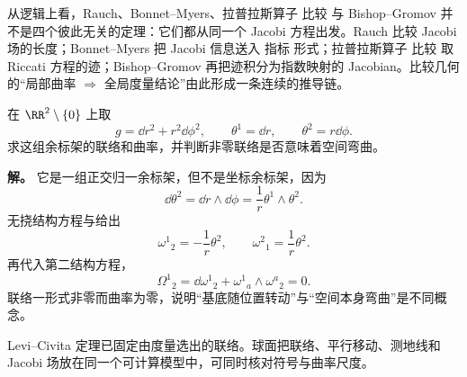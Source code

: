 从逻辑上看，Rauch、Bonnet--Myers、拉普拉斯算子 比较 与 Bishop--Gromov 并不是四个彼此无关的定理：它们都从同一个 Jacobi 方程出发。Rauch 比较 Jacobi 场的长度；Bonnet--Myers 把 Jacobi 信息送入 指标 形式；拉普拉斯算子 比较 取 Riccati 方程的迹；Bishop--Gromov 再把迹积分为指数映射的 Jacobian。比较几何的“局部曲率 $\Rightarrow$ 全局度量结论”由此形成一条连续的推导链。

\begin{exbox}[极坐标中的平坦欧氏平面]
在 $\RR^2\setminus\{0\}$ 上取
\[
g=\dd r^2+r^2\dd\phi^2,
\qquad
\theta^1=\dd r,
\qquad
\theta^2=r\dd\phi.
\]
求这组余标架的联络和曲率，并判断非零联络是否意味着空间弯曲。

\textbf{解。} 它是一组正交归一余标架，但不是坐标余标架，因为
\[
\dd\theta^2
=\dd r\wedge\dd\phi
=\frac1r\theta^1\wedge\theta^2.
\]
无挠结构方程与给出
\[
\omega^1{}_2=-\frac1r\theta^2,
\qquad
\omega^2{}_1=\frac1r\theta^2.
\]
再代入第二结构方程，
\[
\Omega^1{}_2
=\dd\omega^1{}_2
+\omega^1{}_a\wedge\omega^a{}_2=0.
\]
联络一形式非零而曲率为零，说明“基底随位置转动”与“空间本身弯曲”是不同概念。
\end{exbox}


Levi--Civita 定理已固定由度量选出的联络。球面把联络、平行移动、测地线和 Jacobi 场放在同一个可计算模型中，可同时核对符号与曲率尺度。






